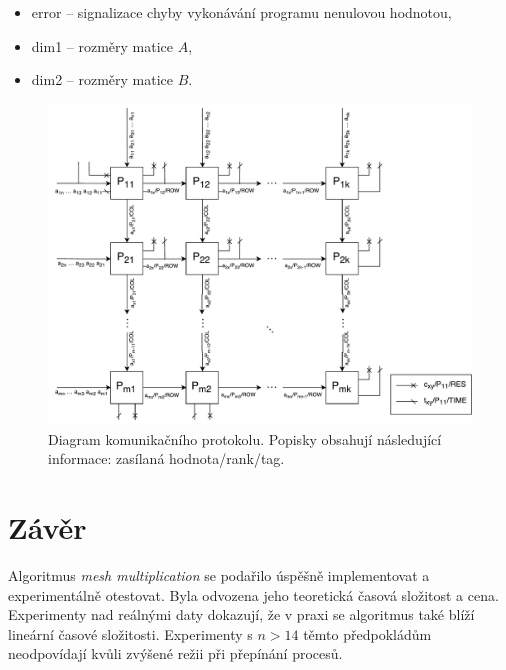 \documentclass[11pt,a4paper]{article}
\begin{document}
\begin{itemize}
    \item{error -- signalizace chyby vykonávání programu nenulovou hodnotou,}
    \item{dim1 -- rozměry matice $A$,}
    \item{dim2 -- rozměry matice $B$.}
\end{itemize}

\begin{figure}[!h]
    \includegraphics[width=1\linewidth]{protokol}
    \centering
    \caption{Diagram komunikačního protokolu. Popisky obsahují následující informace: zasílaná hodnota/rank/tag.}
    \label{proto_schema}
\end{figure}


\section{Závěr}

Algoritmus \textit{mesh multiplication} se podařilo úspěšně implementovat a experimentálně otestovat. Byla odvozena jeho teoretická časová složitost a cena. Experimenty nad reálnými daty dokazují, že v praxi se algoritmus také blíží lineární časové složitosti. Experimenty s $n > 14$ těmto předpokládům neodpovídají kvůli zvýšené režii při přepínání procesů.

%

%
\end{document}
